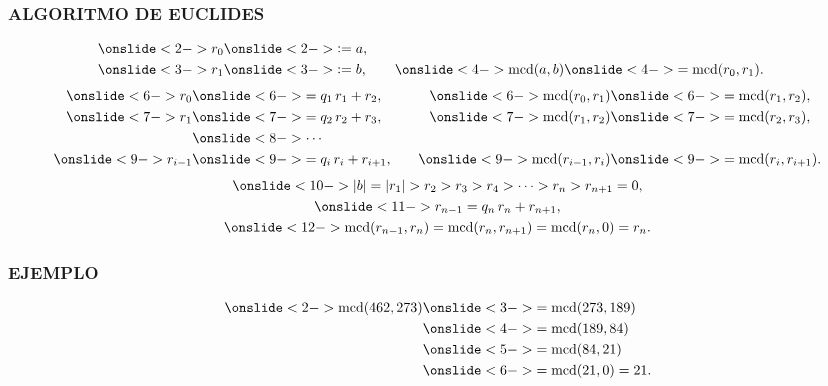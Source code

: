 \begin{frame}
  \frametitle{ALGORITMO DE EUCLIDES}

  \begin{align*}
    \onslide<2->{r_0} & \onslide<2->{\dfn a,} \\
    \onslide<3->{r_1} & \onslide<3->{\dfn b,} &&& \onslide<4->{\mcd (a,b)} & \onslide<4->{= \mcd (r_0,r_1).}
  \end{align*}
  \begin{align*}
    \onslide<6->{r_0} & \onslide<6->{= q_1\,r_1 + r_2,} &&& \onslide<6->{\mcd (r_0,r_1)} & \onslide<6->{= \mcd (r_1,r_2),} \\
    \onslide<7->{r_1} & \onslide<7->{= q_2\,r_2 + r_3,} &&& \onslide<7->{\mcd (r_1,r_2)} & \onslide<7->{= \mcd (r_2,r_3),} \\
                      & \onslide<8->{\cdots} \\
    \onslide<9->{r_{i-1}} & \onslide<9->{= q_i\,r_i + r_{i+1},} &&& \onslide<9->{\mcd (r_{i-1},r_i)} & \onslide<9->{= \mcd (r_i,r_{i+1}).} \\
  \end{align*}
  \begin{gather*}
    \onslide<10->{|b| = |r_1| > r_2 > r_3 > r_4 > \cdots > r_n > r_{n+1} = 0,} \\
    \onslide<11->{r_{n-1} = q_n\,r_n + r_{n+1},} \\
    \onslide<12->{\mcd (r_{n-1},r_n) = \mcd (r_n,r_{n+1}) = \mcd (r_n,0) = r_n.}
  \end{gather*}
\end{frame}

\begin{frame}
  \frametitle{EJEMPLO}

  \begin{align*}
    \onslide<2->{\mcd (462, 273)} & \onslide<3->{= \mcd (273, 189)} \\
                                  & \onslide<4->{= \mcd (189, 84)} \\
                                  & \onslide<5->{= \mcd (84, 21)} \\
                                  & \onslide<6->{= \mcd (21, 0) = 21.}
  \end{align*}


  \vspace{1em}

\end{frame}

